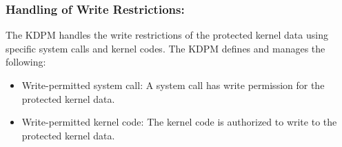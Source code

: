 


\subsubsection{Handling of Write Restrictions:}

The KDPM handles the write restrictions of the protected
kernel data using specific system calls and kernel codes.
%
The KDPM defines and manages the following:

\begin{itemize}
\item Write-permitted system call: A system call has write permission for
the protected kernel data.

\item Write-permitted kernel code: The kernel code is authorized to write
to the protected kernel data. 

\end{itemize}


